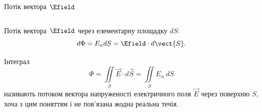\documentclass{beamer}
\begin{document}
\begin{frame}{Потік вектора $\Efield$}{}
\begin{columns}
\begin{column}{0.5\linewidth}
		\end{column}
	\end{columns}
	\begin{block}{}\centering\justifying
		Потік вектора $\Efield$ через елементарну площадку $dS$:
		\begin{equation*}
			d\Phi = E_n dS = \Efield\cdot d\vect{S}.
		\end{equation*}
	\end{block}
	\begin{block}{}\justifying
		Інтеграл
		\begin{equation*}
			\Phi = 	\iint\limits_S \vec{E}\cdot d\vec{S} = \iint\limits_S E_n\ dS
		\end{equation*}
		називають \alert{потоком вектора напруженості електричного поля} $\vec{E}$ через поверхню
		$S$, хоча з цим поняттям і не пов'язана жодна реальна течія.
	\end{block}
\end{frame}
\end{document}
